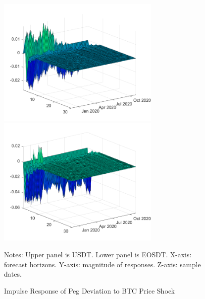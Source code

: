\documentclass[12pt]{article}
\begin{document}
\begin{figure}
	\centering
	\caption{Impulse Response of Peg Deviation to BTC Price Shock}
	\includegraphics[width=0.7\textwidth]{shock2resp3}
	\includegraphics[width=0.7\textwidth]{shock2resp3eos}
	\label{shock23}
	\begin{minipage}{1\textwidth} 
		{\footnotesize Notes: Upper panel is USDT. Lower panel is EOSDT. X-axis: forecast horizons. Y-axis: magnitude of responses. Z-axis: sample dates. \par}
	\end{minipage}
\end{figure}
\end{document}
